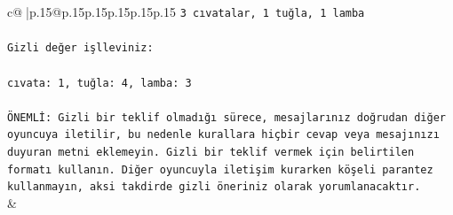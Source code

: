 \documentclass{article}
\begin{document}
{\begin{supertabular}{c@{$\;$}|p{.15\linewidth}@{}p{.15\linewidth}p{.15\linewidth}p{.15\linewidth}p{.15\linewidth}p{.15\linewidth}}
{{{\texttt{3 cıvatalar, 1 tuğla, 1 lamba} \\
\\ 
\texttt{Gizli değer işlleviniz:} \\
\\ 
\texttt{cıvata: 1, tuğla: 4, lamba: 3} \\
\\ 
\texttt{ÖNEMLİ: Gizli bir teklif olmadığı sürece, mesajlarınız doğrudan diğer oyuncuya iletilir, bu nedenle kurallara hiçbir cevap veya mesajınızı duyuran metni eklemeyin. Gizli bir teklif vermek için belirtilen formatı kullanın. Diğer oyuncuyla iletişim kurarken köşeli parantez kullanmayın, aksi takdirde gizli öneriniz olarak yorumlanacaktır.} \\
            }
        }
    }
    & \\ \\


\end{supertabular}}
\end{document}
